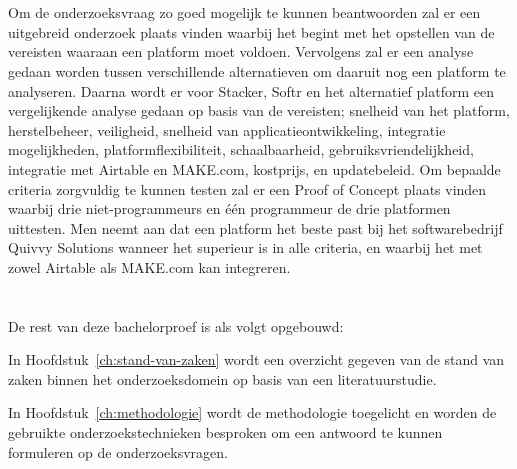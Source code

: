 \section{}%
\label{sec:onderzoeksdoelstelling}
Om de onderzoeksvraag zo goed mogelijk te kunnen beantwoorden zal er een uitgebreid onderzoek plaats vinden waarbij het begint met het opstellen 
van de vereisten waaraan een platform moet voldoen. Vervolgens zal er een analyse gedaan worden tussen verschillende alternatieven om daaruit nog een platform 
te analyseren. Daarna wordt er voor Stacker, Softr en het alternatief platform een vergelijkende analyse gedaan op basis van de vereisten; snelheid van het platform, 
herstelbeheer, veiligheid, snelheid van applicatieontwikkeling, integratie mogelijkheden, platformflexibiliteit, schaalbaarheid, gebruiksvriendelijkheid, integratie met 
Airtable en MAKE.com, kostprijs, en updatebeleid. Om bepaalde criteria zorgvuldig te kunnen testen zal er een Proof of Concept plaats vinden waarbij drie 
niet-programmeurs en één programmeur de drie platformen uittesten. Men neemt aan dat een platform het beste past bij het softwarebedrijf Quivvy Solutions wanneer het superieur is in alle criteria, en 
waarbij het met zowel Airtable als MAKE.com kan integreren.

\section{}%
\label{sec:opzet-bachelorproef}


De rest van deze bachelorproef is als volgt opgebouwd:

In Hoofdstuk~\ref{ch:stand-van-zaken} wordt een overzicht gegeven van de stand van zaken binnen het onderzoeksdomein op basis van een literatuurstudie.

In Hoofdstuk~\ref{ch:methodologie} wordt de methodologie toegelicht en worden de gebruikte onderzoekstechnieken besproken om een antwoord te kunnen formuleren op de onderzoeksvragen.

